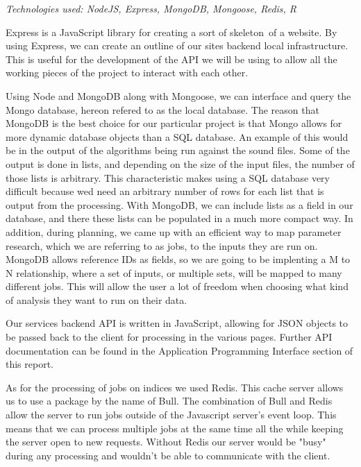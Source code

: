 \begin{flushleft}
\noindent
\textit{Technologies used: NodeJS, Express, MongoDB, Mongoose, Redis, R}\par
Express is a JavaScript library for creating a sort of \textquotesingle skeleton\textquotesingle\ of a website. By using Express, we can create an outline of our site\textquotesingle s backend local infrastructure. This is useful for the development of the API we will be using to allow all the working pieces of the project to interact with each other.\par
Using Node and MongoDB along with Mongoose, we can interface and query the Mongo database, hereon refered to as the local database. The reason that MongoDB is the best choice for our particular project is that Mongo allows for more dynamic database objects than a SQL database. An example of this would be in the output of the algorithms being run against the sound files. Some of the output is done in lists, and depending on the size of the input files, the number of those lists is arbitrary. This characteristic makes using a SQL database very difficult because we\textquotesingle d need an arbitrary number of rows for each list that is output from the processing. With MongoDB, we can include lists as a field in our database, and there these lists can be populated in a much more compact way. In addition, during planning, we came up with an efficient way to map parameter research, which we are referring to as jobs, to the inputs they are run on. MongoDB allows reference IDs as fields, so we are going to be implenting a M to N relationship, where a set of inputs, or multiple sets, will be mapped to many different jobs. This will allow the user a lot of freedom when choosing what kind of analysis they want to run on their data.\par
Our service\textquotesingle s backend API is written in JavaScript, allowing for JSON objects to be passed back to the client for processing in the various pages. Further API documentation can be found in the Application Programming Interface section of this report.\par
As for the processing of jobs on indices we used Redis. This cache server allows us to use a package by the name of Bull. The combination of Bull and Redis allow the server to run jobs outside of the Javascript server's event loop. This means that we can process multiple jobs at the same time all the while keeping the server open to new requests. Without Redis our server would be "busy" during any processing and wouldn't be able to communicate with the client.\par

\end{flushleft}
